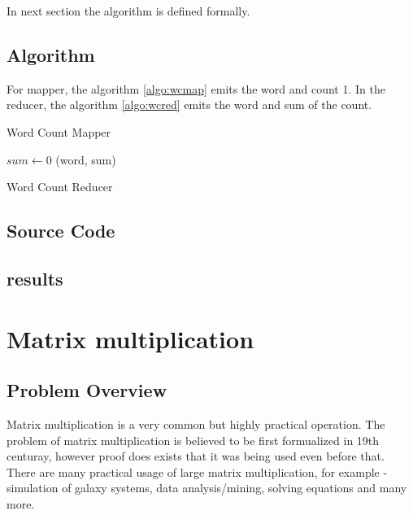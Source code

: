 \documentclass{article}
\begin{document}
\BlankLine In next section the algorithm is defined formally.

\subsection{Algorithm}
For mapper, the algorithm \ref{algo:wcmap} emits the word and count 1. In the reducer, the algorithm \ref{algo:wcred} emits the word and sum of the count.
\BlankLine
\IncMargin{1em}
\begin{algorithm}
\DontPrintSemicolon
{}
\BlankLine
{}
\caption{Word Count Mapper\label{algo:wcmap}}
\end{algorithm}
\DecMargin{1em}

\IncMargin{1em}
\begin{algorithm}
\DontPrintSemicolon
{}
\BlankLine
$sum\leftarrow $0\;
\emit(word, sum)\;
\caption{Word Count Reducer\label{algo:wcred}}
\end{algorithm}
\DecMargin{1em}

\subsection{Source Code}
\subsection{results}

\section{Matrix multiplication}

\subsection{Problem Overview}
Matrix multiplication is a very common but highly practical operation. The problem of matrix multiplication is believed to be first formualized in 19th centuray, however proof does exists that it was being used even before that. There are many practical usage of large matrix multiplication, for example - simulation of galaxy systems, data analysis/mining, solving equations and many more.
\end{document}
